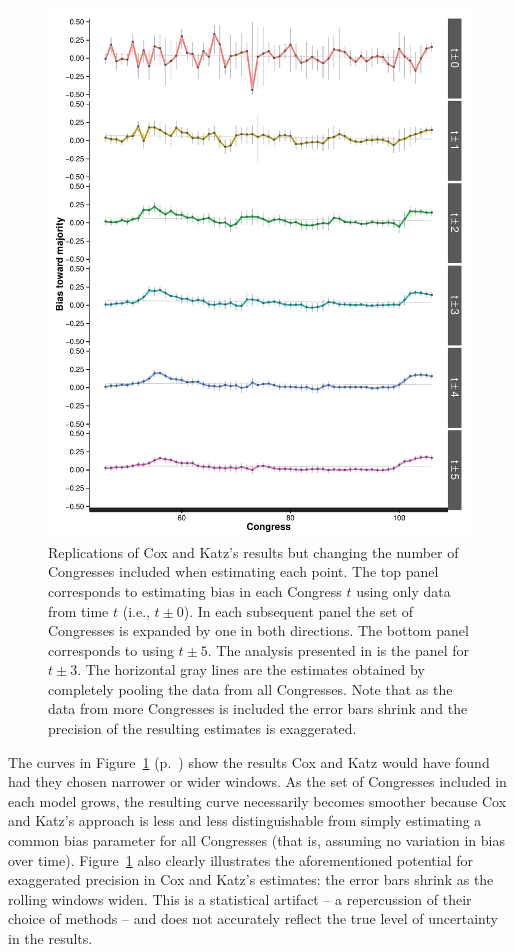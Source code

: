 \begin{figure}
\centering
\includegraphics[scale=0.75]{sections/figs/ck_windows}
\caption{Replications of Cox and Katz's results but changing the number of Congresses 
included when estimating each point. The top panel corresponds to estimating bias in each 
Congress $t$ using only data from time $t$ (i.e., $t \pm 0$). In each subsequent panel the 
set of Congresses is expanded by one in both directions. The bottom panel corresponds to 
using $t \pm 5$. The analysis presented in \protect{} is the 
panel for $t \pm 3$. The horizontal gray lines are the estimates obtained by completely 
pooling the data from all Congresses. Note that as the data from more Congresses is included 
the error bars shrink and the precision of the resulting estimates is exaggerated.}
\label{fig:ck_hypothetical}
\end{figure}


The curves in Figure~\ref{fig:ck_hypothetical} (p.~\pageref{fig:ck_hypothetical}) show the 
results Cox and Katz would have found had they chosen narrower or wider windows. As the 
set of Congresses included in each model grows, the resulting curve necessarily becomes 
smoother because Cox and Katz's approach is less and less distinguishable from simply 
estimating a common bias parameter for all Congresses (that is, assuming no variation in 
bias over time). Figure~\ref{fig:ck_hypothetical} also clearly illustrates the aforementioned potential 
for exaggerated precision in Cox and Katz's estimates: the error bars shrink as the rolling windows
widen. This is a statistical artifact -- a repercussion of their choice of methods -- and does not accurately 
reflect the true level of uncertainty in the results.  

